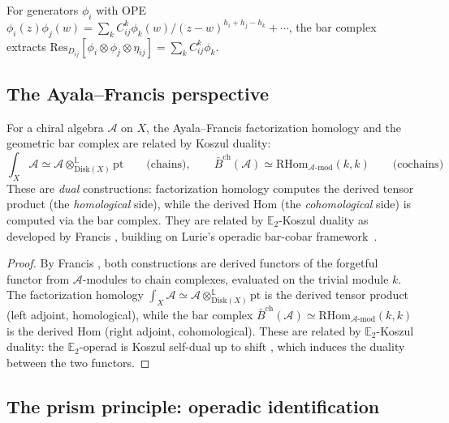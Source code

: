 \begin{example}
For generators $\phi_i$ with OPE $\phi_i(z) \phi_j(w) = \sum_k C_{ij}^k \phi_k(w)/(z-w)^{h_i + h_j - h_k} + \cdots$, the bar complex extracts $\mathrm{Res}_{D_{ij}}[\phi_i \otimes \phi_j \otimes \eta_{ij}] = \sum_k C_{ij}^k \phi_k$.
\end{example}

\subsection{The Ayala--Francis perspective}

\begin{theorem}\label{thm:fact-homology-quantum}
For a chiral algebra $\mathcal{A}$ on $X$, the Ayala--Francis factorization homology and the geometric bar complex are related by Koszul duality:
\[\int_X \mathcal{A} \simeq \mathcal{A} \otimes^{\mathbb{L}}_{\mathrm{Disk}(X)} \mathrm{pt} \qquad \text{(chains)}, \qquad \bar{B}^{\mathrm{ch}}(\mathcal{A}) \simeq \mathrm{RHom}_{\mathcal{A}\text{-mod}}(k, k) \qquad \text{(cochains)}\]
These are \emph{dual} constructions: factorization homology computes the derived tensor product (the \emph{homological} side), while the derived Hom (the \emph{cohomological} side) is computed via the bar complex. They are related by $\mathbb{E}_2$-Koszul duality as developed by Francis \cite{Francis2013}, building on Lurie's operadic bar-cobar framework~\cite[§5.2]{HA}.
\end{theorem}

\begin{proof}
By Francis \cite{Francis2013}, both constructions are derived functors of the forgetful functor from $\mathcal{A}$-modules to chain complexes, evaluated on the trivial module $k$. The factorization homology $\int_X \mathcal{A} \simeq \mathcal{A} \otimes^{\mathbb{L}}_{\mathrm{Disk}(X)} \mathrm{pt}$ is the derived tensor product (left adjoint, homological), while the bar complex $\bar{B}^{\mathrm{ch}}(\mathcal{A}) \simeq \mathrm{RHom}_{\mathcal{A}\text{-mod}}(k, k)$ is the derived Hom (right adjoint, cohomological). These are related by $\mathbb{E}_2$-Koszul duality: the $\mathbb{E}_2$-operad is Koszul self-dual up to shift \cite[Theorem~5.2]{Francis2013}, which induces the duality between the two functors.
\end{proof}

\subsection{The prism principle: operadic identification}%
\label{subsec:prism-operadic}

